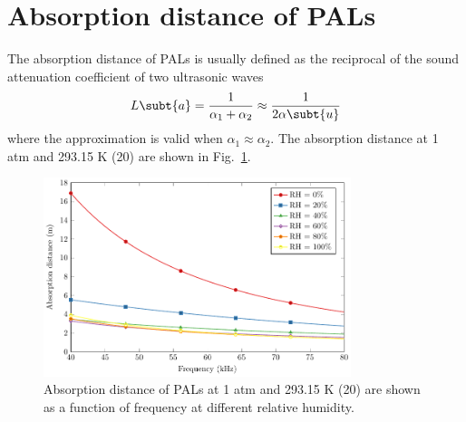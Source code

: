 \section{Absorption distance of PALs}
The absorption distance of PALs is usually defined as the reciprocal of the sound attenuation coefficient of two ultrasonic waves \cite{Shi2013InvestigationSteerableParametric, Farias2015RayleighDistanceAbsorption}
\begin{equation}
    L\subt{a} = \frac{1}{\alpha_1+\alpha_2}\approx \frac{1}{2\alpha\subt{u}}
    \label{eq:2390jfklsdfjsd}
\end{equation}
where the approximation is valid when $\alpha_1\approx \alpha_2$.
The absorption distance at 1 atm and 293.15 K (20\celsius {}) are shown in Fig.~\ref{fig:4120312002}.

\begin{figure}[!htb]
    \centering
    \includegraphics[width = 0.8\textwidth]{fig/AbsorpLen_demo211218A.pdf}
    \caption{Absorption distance of PALs at 1 atm and 293.15 K (20\celsius {})  are shown as a function of frequency at different relative humidity.}
    \label{fig:4120312002}
\end{figure}

